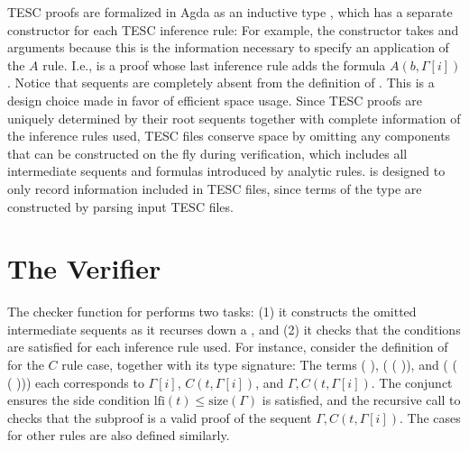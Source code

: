 \documentclass[12pt]{article}
\newcommand{\lfi}[0]{\mathrm{lfi}}
\newcommand{\size}[0]{\mathrm{size}}
\begin{document}
TESC proofs are formalized in Agda as an inductive type ,
which has a separate constructor for each TESC inference rule: 
For example, the constructor  takes  
 and  arguments because this is the 
information necessary to specify an application of the $A$ rule. I.e.,  
    
is a proof whose last inference rule adds the formula $A(b, \Gamma[i])$. 
Notice that sequents are completely absent from the definition of .
This is a design choice made in favor of efficient space usage. Since TESC proofs are uniquely 
determined by their root sequents together with complete information of the inference rules used,
TESC files conserve space by omitting any components that can be constructed on the fly during 
verification, which includes all intermediate sequents and formulas introduced by analytic rules. 
 is designed to only record information included in TESC files, 
since terms of the type  are constructed by parsing input TESC files.



\section{The Verifier} \label{sec:verifier} 

The checker function  for  performs two tasks: 
(1) it constructs the omitted intermediate sequents as it recurses down a , and 
(2) it checks that the conditions are satisfied for each inference rule used. For instance, 
consider the definition of  for the $C$ rule case, together with  
its type signature:
The terms (  ),  
(  (  )),  
and (  (  (  )))
each corresponds to $\Gamma[i]$, $C(t, \Gamma[i])$, and $\Gamma, C(t, \Gamma[i])$.
The conjunct 
ensures the side condition $\lfi(t) \le \size(\Gamma)$ is satisfied, and the recursive call to 
 checks that the subproof  is a valid proof of
the sequent $\Gamma, C(t, \Gamma[i])$. The cases for other rules are also defined similarly.
\end{document}
